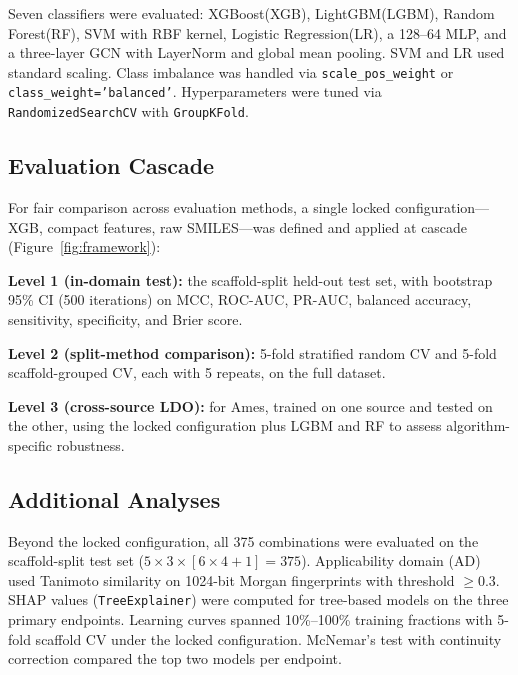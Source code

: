 Seven classifiers were evaluated: XGBoost(XGB),\cite{Chen_XGBoost_2016} LightGBM(LGBM),\cite{Ke_LightGBM_2017} Random Forest(RF),\cite{Breiman_2001} SVM with RBF kernel,\cite{Cortes_Vapnik_1995}
Logistic Regression(LR),\cite{Cox_1958} a 128--64 MLP,\cite{Rumelhart_1986} and a three-layer GCN\cite{Kipf_Welling_2017} with LayerNorm and global mean pooling. SVM and LR used standard scaling.
Class imbalance was handled via \texttt{scale\_pos\_weight} or \texttt{class\_weight='balanced'}. Hyperparameters were tuned via \texttt{RandomizedSearchCV} with \texttt{GroupKFold}.\cite{Pedregosa_sklearn_2011}

\subsection{Evaluation Cascade}

For fair comparison across evaluation methods, a single locked configuration---XGB, compact features, raw SMILES---was defined and applied at cascade (Figure~\ref{fig:framework}):

\textbf{Level 1 (in-domain test):} the scaffold-split held-out test set, with bootstrap 95\% CI (500 iterations) on MCC,\cite{Matthews_1975} ROC-AUC, PR-AUC, balanced accuracy, sensitivity, specificity, and Brier score.\cite{Brier_1950}

\textbf{Level 2 (split-method comparison):} 5-fold stratified random CV and 5-fold scaffold-grouped CV, each with 5 repeats, on the full dataset.

\textbf{Level 3 (cross-source LDO):} for Ames, trained on one source and tested on the other, using the locked configuration plus LGBM and RF to assess algorithm-specific robustness.

\subsection{Additional Analyses}

Beyond the locked configuration, all 375 combinations were evaluated on the scaffold-split test set ($5 \times 3 \times [6 \times 4 + 1] = 375$). Applicability domain (AD) used 
Tanimoto similarity on 1024-bit Morgan fingerprints\cite{Rogers_Hahn_2010} with threshold $\geq 0.3$. SHAP values\cite{Lundberg_SHAP_2017} (\texttt{TreeExplainer})
were computed for tree-based models on the three primary endpoints. Learning curves spanned 10\%--100\% training fractions with 5-fold scaffold CV under the locked configuration.
McNemar's test\cite{McNemar_1947} with continuity correction compared the top two models per endpoint.

